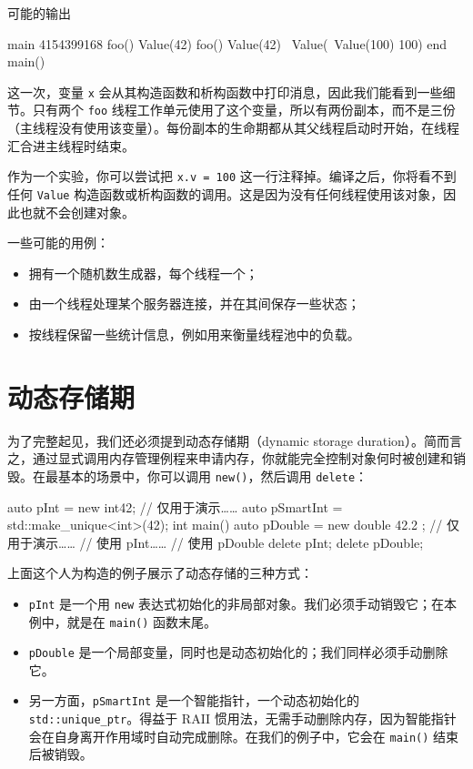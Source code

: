 可能的输出

\begin{codebox}[cpp]
main 4154399168
foo()
Value(42)
foo()
Value(42)
~Value(~Value(100)
100)
end main()
\end{codebox}

这一次，变量 \texttt{x} 会从其构造函数和析构函数中打印消息，因此我们能看到一些细节。只有两个 \texttt{foo} 线程工作单元使用了这个变量，所以有两份副本，而不是三份（主线程没有使用该变量）。每份副本的生命期都从其父线程启动时开始，在线程汇合进主线程时结束。

作为一个实验，你可以尝试把 \texttt{x.v = 100} 这一行注释掉。编译之后，你将看不到任何 \texttt{Value} 构造函数或析构函数的调用。这是因为没有任何线程使用该对象，因此也就不会创建对象。

一些可能的用例：

\begin{itemize}
\item 拥有一个随机数生成器，每个线程一个；
\item 由一个线程处理某个服务器连接，并在其间保存一些状态；
\item 按线程保留一些统计信息，例如用来衡量线程池中的负载。
\end{itemize}

\section{动态存储期}

为了完整起见，我们还必须提到动态存储期（dynamic storage duration）。简而言之，通过显式调用内存管理例程来申请内存，你就能完全控制对象何时被创建和销毁。在最基本的场景中，你可以调用 \texttt{new()}，然后调用 \texttt{delete}：

\begin{codebox}[cpp]
auto pInt = new int{42}; // 仅用于演示……
auto pSmartInt = std::make_unique<int>(42);
int main() {
auto pDouble = new double { 42.2 }; // 仅用于演示……
// 使用 pInt……
// 使用 pDouble
delete pInt;
delete pDouble;
}
\end{codebox}

上面这个人为构造的例子展示了动态存储的三种方式：

\begin{itemize}
\item \texttt{pInt} 是一个用 \texttt{new} 表达式初始化的非局部对象。我们必须手动销毁它；在本例中，就是在 \texttt{main()} 函数末尾。
\item \texttt{pDouble} 是一个局部变量，同时也是动态初始化的；我们同样必须手动删除它。
\item 另一方面，\texttt{pSmartInt} 是一个智能指针，一个动态初始化的 \texttt{std::unique\_ptr}。得益于 RAII 惯用法，无需手动删除内存，因为智能指针会在自身离开作用域时自动完成删除。在我们的例子中，它会在 \texttt{main()} 结束后被销毁。
\end{itemize}

